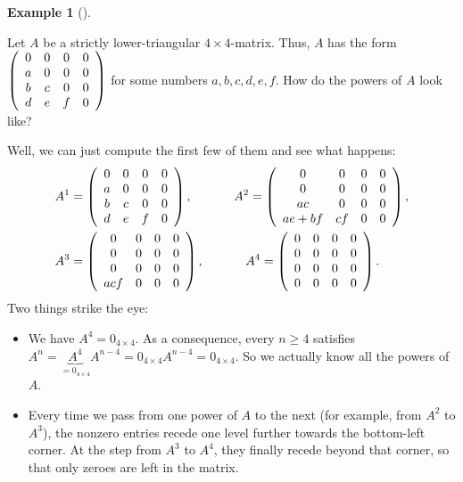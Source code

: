 \documentclass[numbers=enddot,12pt,final,onecolumn,notitlepage]{scrartcl}%
\theoremstyle{definition}
\newtheorem{exam}[theo]{Example}
\newenvironment{example}[1][]
{\begin{exam}[#1]\begin{leftbar}}
{\end{leftbar}\end{exam}}
\begin{document}
\begin{example}
\label{exam.triangular.strict.nilp}Let $A$ be a strictly lower-triangular
$4\times4$-matrix. Thus, $A$ has the form $\left(
\begin{array}
[c]{cccc}%
0 & 0 & 0 & 0\\
a & 0 & 0 & 0\\
b & c & 0 & 0\\
d & e & f & 0
\end{array}
\right)  $ for some numbers $a,b,c,d,e,f$. How do the powers of $A$ look like?

Well, we can just compute the first few of them and see what happens:%
\begin{align*}
A^{1}  &  =\left(
\begin{array}
[c]{cccc}%
0 & 0 & 0 & 0\\
a & 0 & 0 & 0\\
b & c & 0 & 0\\
d & e & f & 0
\end{array}
\right)  ,\ \ \ \ \ \ \ \ \ \ A^{2}=\left(
\begin{array}
[c]{cccc}%
0 & 0 & 0 & 0\\
0 & 0 & 0 & 0\\
ac & 0 & 0 & 0\\
ae+bf & cf & 0 & 0
\end{array}
\right)  ,\\
A^{3}  &  =\left(
\begin{array}
[c]{cccc}%
0 & 0 & 0 & 0\\
0 & 0 & 0 & 0\\
0 & 0 & 0 & 0\\
acf & 0 & 0 & 0
\end{array}
\right)  ,\ \ \ \ \ \ \ \ \ \ A^{4}=\left(
\begin{array}
[c]{cccc}%
0 & 0 & 0 & 0\\
0 & 0 & 0 & 0\\
0 & 0 & 0 & 0\\
0 & 0 & 0 & 0
\end{array}
\right)  .
\end{align*}
Two things strike the eye:

\begin{itemize}
\item We have $A^{4}=0_{4\times4}$. As a consequence, every $n\geq4$ satisfies
$A^{n}=\underbrace{A^{4}}_{=0_{4\times4}}A^{n-4}=0_{4\times4}A^{n-4}%
=0_{4\times4}$. So we actually know all the powers of $A$.

\item Every time we pass from one power of $A$ to the next (for example, from
$A^{2}$ to $A^{3}$), the nonzero entries recede one level further towards the
bottom-left corner. At the step from $A^{3}$ to $A^{4}$, they finally recede
beyond that corner, so that only zeroes are left in the matrix.
\end{itemize}
\end{example}
\end{document}
